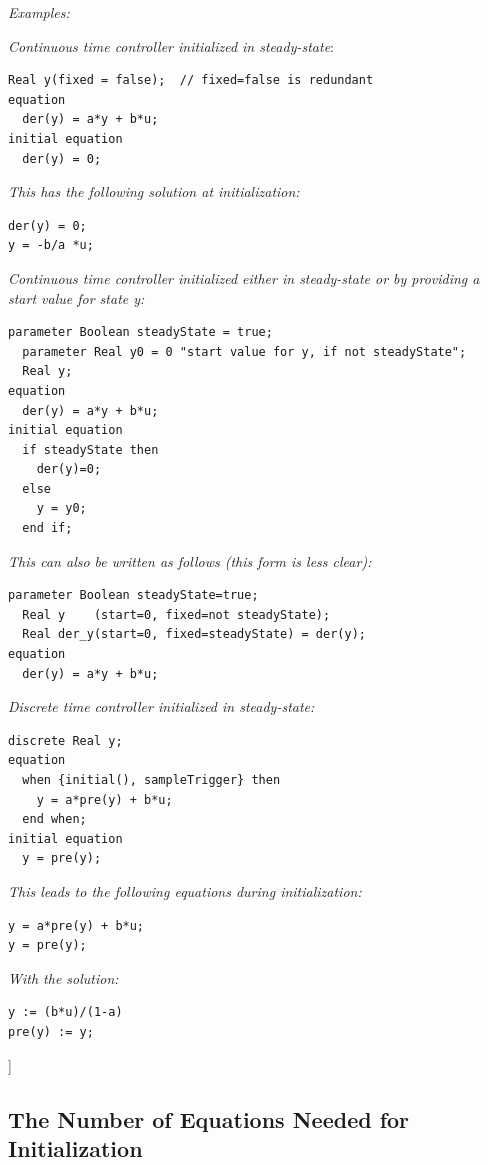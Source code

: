 \documentclass[10pt,a4paper]{report}
\def\doublelabel#1{\label{#1}}
\begin{document}
\emph{Examples:}

\emph{Continuous time controller initialized in steady-state}:
\begin{lstlisting}[language=modelica]
  Real y(fixed = false);  // fixed=false is redundant    
equation   
  der(y) = a*y + b*u; 
initial equation   
  der(y) = 0;
\end{lstlisting}

\emph{This has the following solution at initialization:}
\begin{lstlisting}[language=modelica]
der(y) = 0;
y = -b/a *u;
\end{lstlisting}

\emph{Continuous time controller initialized either in steady-state or
by providing a start value for state y:}
\begin{lstlisting}[language=modelica]
  parameter Boolean steadyState = true;
  parameter Real y0 = 0 "start value for y, if not steadyState";
  Real y;
equation
  der(y) = a*y + b*u;
initial equation
  if steadyState then
    der(y)=0;
  else
    y = y0;
  end if; 
\end{lstlisting}

\emph{This can also be written as follows (this form is less clear):}
\begin{lstlisting}[language=modelica]
  parameter Boolean steadyState=true;
  Real y    (start=0, fixed=not steadyState);
  Real der_y(start=0, fixed=steadyState) = der(y);
equation
  der(y) = a*y + b*u; 
\end{lstlisting}

\emph{Discrete time controller initialized in steady-state:}
\begin{lstlisting}[language=modelica]
  discrete Real y;
equation
  when {initial(), sampleTrigger} then
    y = a*pre(y) + b*u;
  end when;
initial equation
  y = pre(y);
\end{lstlisting}

\emph{This leads to the following equations during initialization:}
\begin{lstlisting}[language=modelica]
y = a*pre(y) + b*u;
y = pre(y);
\end{lstlisting}

\emph{With the solution:}
\begin{lstlisting}[language=modelica]
y := (b*u)/(1-a)
pre(y) := y;
\end{lstlisting}

{]}

\subsection{The Number of Equations Needed for Initialization}\doublelabel{the-number-of-equations-needed-for-initialization}
\end{document}
